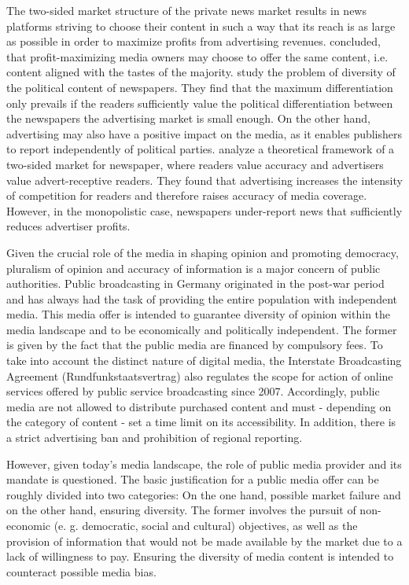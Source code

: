 \documentclass[12pt,a4paper,notitlepage]{article}
\begin{document}
The two-sided market structure of the private news market results in news platforms striving to choose their content in such a way that its reach is as large as possible in order to maximize profits from advertising revenues. \citet{steiner_program_1952} concluded, that profit-maximizing media owners may choose to offer the same content, i.e. content aligned with the tastes of the majority. \citep{gabszewicz_press_2001} study the problem of diversity of the political content of newspapers. They find that the maximum differentiation only prevails if the readers sufficiently value the political differentiation between the newspapers the advertising market is small enough. On the other hand, advertising may also have a positive impact on the media, as it enables publishers to report independently of political parties. \citet{ellman_what_2009} analyze a theoretical framework of a two-sided market for newspaper, where readers value accuracy and advertisers value advert-receptive readers. They found that advertising increases the intensity of competition for readers and therefore raises accuracy of media coverage. However, in the monopolistic case, newspapers under-report news that sufficiently reduces advertiser profits. 

Given the crucial role of the media in shaping opinion and promoting democracy, pluralism of opinion and accuracy of information is a major concern of public authorities. Public broadcasting in Germany originated in the post-war period and has always had the task of providing the entire population with independent media. This media offer is intended to guarantee diversity of opinion within the media landscape and to be economically and politically independent. The former is given by the fact that the public media are financed by compulsory fees. To take into account the distinct nature of digital media, the Interstate Broadcasting Agreement (Rundfunkstaatsvertrag) also regulates the scope for action of online services offered by public service broadcasting since 2007. Accordingly, public media are not allowed to distribute purchased content and must - depending on the category of content - set a time limit on its accessibility. In addition, there is a strict advertising ban and prohibition of regional reporting. 

However, given today's media landscape, the role of public media provider and its mandate is questioned. The basic justification for a public media offer can be roughly divided into two categories: On the one hand, possible market failure and on the other hand, ensuring diversity. The former involves the pursuit of non-economic (e. g. democratic, social and cultural) objectives, as well as the provision of information that would not be made available by the market due to a lack of willingness to pay. Ensuring the diversity of media content is intended to counteract possible media bias. 
\end{document}
